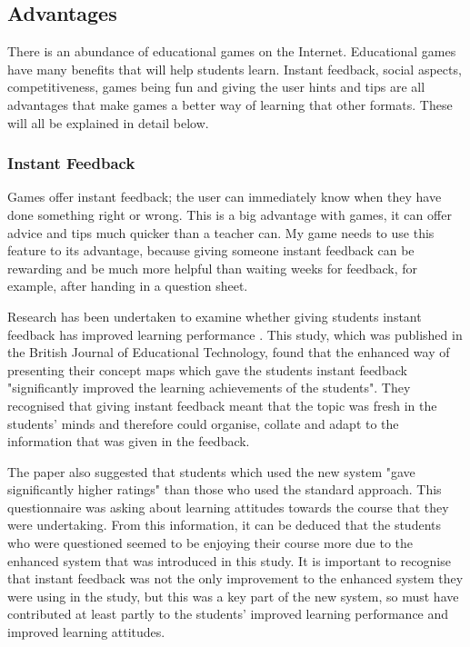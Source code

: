 \documentclass[a4paper]{article}
\begin{document}
\subsection{Advantages}

There is an abundance of educational games on the Internet. Educational games have many benefits that will help students learn. Instant feedback, social aspects, competitiveness, games being fun and giving the user hints and tips are all advantages that make games a better way of learning that other formats. These will all be explained in detail below. 

\subsubsection{Instant Feedback}
Games offer instant feedback; the user can immediately know when they have done something right or wrong. This is a big advantage with games, it can offer advice and tips much quicker than a teacher can. My game needs to use this feature to its advantage, because giving someone instant feedback can be rewarding and be much more helpful than waiting weeks for feedback, for example, after handing in a question sheet. 

Research has been undertaken to examine whether giving students instant feedback has improved learning performance \cite{wu2012innovative}. This study, which was published in the British Journal of Educational Technology, found that the enhanced way of presenting their concept maps which gave the students instant feedback "significantly improved the learning achievements of the students". They recognised that giving instant feedback meant that the topic was fresh in the students' minds and therefore could organise, collate and adapt to the information that was given in the feedback.

The paper also suggested that students which used the new system "gave significantly higher ratings" than those who used the standard approach. This questionnaire was asking about learning attitudes towards the course that they were undertaking. From this information, it can be deduced that the students who were questioned seemed to be enjoying their course more due to the enhanced system that was introduced in this study. It is important to recognise that instant feedback was not the only improvement to the enhanced system they were using in the study, but this was a key part of the new system, so must have contributed at least partly to the students' improved learning performance and improved learning attitudes.
\end{document}
